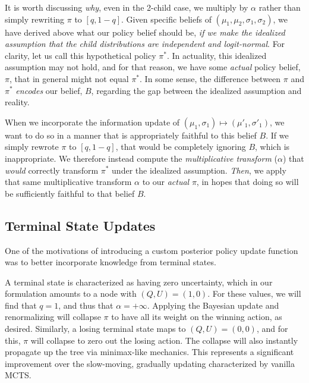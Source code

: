 \documentclass[tikz]{article}
\begin{document}
It is worth discussing \emph{why}, even in the 2-child case, we multiply by $\alpha$ rather than simply rewriting $\pi$ to $[q, 1-q]$.
Given specific beliefs of $(\mu_1, \mu_2, \sigma_1, \sigma_2)$, we have derived above what our policy belief should be, \textit{if we make
the idealized assumption that the child distributions are independent and logit-normal}. For clarity, let us call this hypothetical policy $\pi^*$.
In actuality, this idealized assumption may not hold, and for that reason, we have some \textit{actual} policy belief, $\pi$, that in general might not
equal $\pi^*$. In some sense, the difference between $\pi$ and $\pi^*$ \emph{encodes} our belief, $B$, regarding the gap between
the idealized assumption and reality. \newline

When we incorporate the information update of $(\mu_1, \sigma_1) \mapsto (\mu'_1, \sigma'_1)$, we want to do so in
a manner that is appropriately faithful to this belief $B$. If we simply rewrote $\pi$ to $[q, 1-q]$, that would be completely
ignoring $B$, which is inappropriate. We therefore instead compute the \textit{multiplicative transform} ($\alpha$)
that \textit{would} correctly transform $\pi^*$ under the idealized assumption. \textit{Then}, we apply that same
multiplicative transform $\alpha$ to our \textit{actual} $\pi$, in hopes that doing so will be sufficiently faithful to that
belief $B$.

\subsection{Terminal State Updates}

One of the motivations of introducing a custom posterior policy update function was to better incorporate knowledge from terminal states. \newline

A terminal state is characterized as having zero uncertainty, which in our formulation amounts to a node with $(Q, U) = (1, 0)$. For
these values, we will find that $q=1$, and thus that $\alpha = +\infty$. Applying the Bayesian update and
renormalizing will collapse $\pi$ to have all its weight on the winning action, as desired. Similarly, a losing terminal state maps
to $(Q, U) = (0, 0)$, and for this, $\pi$ will collapse to zero out the losing action. The collapse will also instantly propagate up the tree via
minimax-like mechanics. This represents a significant improvement over the slow-moving, gradually updating characterized by vanilla MCTS. \newline
\end{document}

